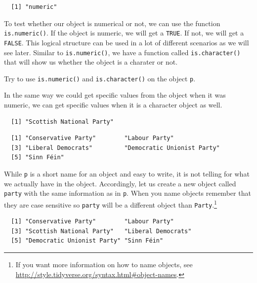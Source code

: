 \documentclass[12pt,oneside]{reedthesis}
\theoremstyle{definition}
\theoremstyle{definition}
\theoremstyle{definition}
\theoremstyle{remark}
\begin{document}
  \begin{verbatim}
  [1] "numeric"
  \end{verbatim}
  To test whether our object is numerical or not, we can use the function
  \texttt{is.numeric()}. If the object is numeric, we will get a
  \texttt{TRUE}. If not, we will get a \texttt{FALSE}. This logical
  structure can be used in a lot of different scenarios as we will see
  later. Similar to \texttt{is.numeric()}, we have a function called
  \texttt{is.character()} that will show us whether the object is a
  charater or not.
  \begin{Shaded}
  \begin{Highlighting}[]
  \end{Highlighting}
  \end{Shaded}
  Try to use \texttt{is.numeric()} and \texttt{is.character()} on the
  object \texttt{p}.
  
  In the same way we could get specific values from the object when it was
  numeric, we can get specific values when it is a character object as
  well.
  \begin{Shaded}
  \begin{Highlighting}[]
  \NormalTok{p[}\NormalTok{]}
  \end{Highlighting}
  \end{Shaded}
  \begin{verbatim}
  [1] "Scottish National Party"
  \end{verbatim}
  \begin{Shaded}
  \begin{Highlighting}[]
  \NormalTok{p[}\OperatorTok{-}\NormalTok{]}
  \end{Highlighting}
  \end{Shaded}
  \begin{verbatim}
  [1] "Conservative Party"        "Labour Party"             
  [3] "Liberal Democrats"         "Democratic Unionist Party"
  [5] "Sinn Féin"                
  \end{verbatim}
  While \texttt{p} is a short name for an object and easy to write, it is
  not telling for what we actually have in the object. Accordingly, let us
  create a new object called \texttt{party} with the same information as
  in \texttt{p}. When you name objects remember that they are case
  sensitive so \texttt{party} will be a different object than
  \texttt{Party}.\footnote{If you want more information on how to name
    objects, see
    \url{http://style.tidyverse.org/syntax.html\#object-names}.}
  \begin{Shaded}
  \begin{Highlighting}[]
  \StringTok{ }
  
  \end{Highlighting}
  \end{Shaded}
  \begin{verbatim}
  [1] "Conservative Party"        "Labour Party"             
  [3] "Scottish National Party"   "Liberal Democrats"        
  [5] "Democratic Unionist Party" "Sinn Féin"                
  \end{verbatim}
\end{document}
